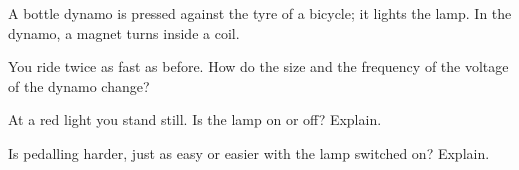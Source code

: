 A bottle dynamo is pressed against the tyre of a bicycle; it lights the lamp. In the dynamo, a magnet turns inside a coil.

\begin{abcliste}
\abc You ride twice as fast as before. How do the size and the frequency of the voltage of the dynamo change?

\abc At a red light you stand still. Is the lamp on or off? Explain.

\abc Is pedalling harder, just as easy or easier with the lamp switched on? Explain.
\end{abcliste}
